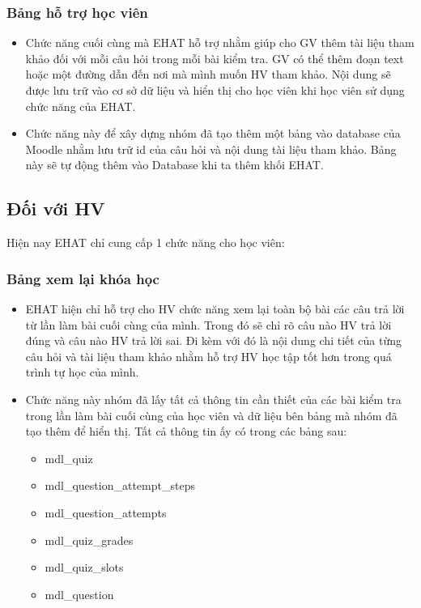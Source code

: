 \subsubsection{Bảng hỗ trợ học viên}
\begin{itemize}
	\item Chức năng cuối cùng mà EHAT hỗ trợ nhằm giúp cho GV thêm tài liệu tham khảo đối với mỗi câu hỏi trong mỗi bài kiểm tra. GV có thể thêm đoạn text hoặc một đường dẫn đến nơi mà mình muốn HV tham khảo. Nội dung sẽ được lưu trữ vào cơ sở dữ liệu và hiển thị cho học viên khi học viên sử dụng chức năng của EHAT.
	
	\item Chức năng này để xây dựng nhóm đã tạo thêm một bảng vào database của Moodle nhằm lưu trữ id của câu hỏi và nội dung tài liệu tham khảo. Bảng này sẽ tự động thêm vào Database khi ta thêm khối EHAT.
\end{itemize}

\subsection{Đối với HV}

Hiện nay EHAT chỉ cung cấp 1 chức năng cho học viên:

\subsubsection{Bảng xem lại khóa học}
\begin{itemize}
	\item EHAT hiện chỉ hỗ trợ cho HV chức năng xem lại toàn bộ bài các câu trả lời từ lần làm bài cuối cùng của mình. Trong đó sẽ chỉ rõ câu nào HV trả lời đúng và câu nào HV trả lời sai. Đi kèm với đó là nội dung chi tiết của từng câu hỏi và tài liệu tham khảo nhằm hỗ trợ HV học tập tốt hơn trong quá trình tự học của mình.
	
	\vskip 5cm
	\item Chức năng này nhóm đã lấy tất cả thông tin cần thiết của các bài kiểm tra trong lần làm bài cuối cùng của học viên và dữ liệu bên bảng mà nhóm đã tạo thêm để hiển thị. Tất cả thông tin ấy có trong các bảng sau:
	\begin{itemize}
		\item mdl\_quiz
		\item mdl\_question\_attempt\_steps 
		\item mdl\_question\_attempts
		\item mdl\_quiz\_grades
		\item mdl\_quiz\_slots
		\item mdl\_question
	\end{itemize}
\end{itemize}

